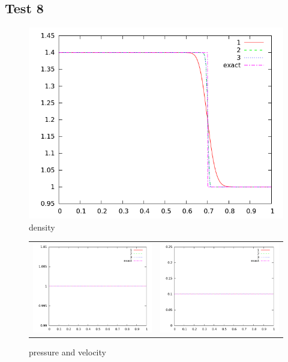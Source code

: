 \documentclass[letterpaper,12pt]{article}
\begin{document}
\clearpage

\subsection{Test 8}

\begin{figure}[h]
  \begin{center}
     \includegraphics[width=.78\textwidth]{den_T8.png}	
  \end{center}
  \caption{density}
\end{figure}

\begin{figure}
  \begin{center}
	\begin{tabular}{cc}
      \includegraphics[width=.425\textwidth]{prs_T8.png} &
	  \includegraphics[width=.425\textwidth]{vel_T8.png}
	\end{tabular}
  \end{center}
  \caption{pressure and velocity}
\end{figure}
\end{document}
